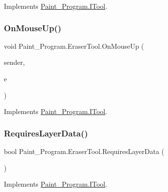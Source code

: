 Implements \mbox{\hyperlink{interface_paint___program_1_1_i_tool_a6a1cbe840b5cfc8a9b9463cc21590845}{Paint\+\_\+\+Program.\+I\+Tool}}.

\mbox{\label{class_paint___program_1_1_eraser_tool_aac92273a8f10a9f9cee6e03b1337f1c5}} 
\subsubsection{\texorpdfstring{On\+Mouse\+Up()}{OnMouseUp()}}
{\footnotesize\ttfamily void Paint\+\_\+\+Program.\+Eraser\+Tool.\+On\+Mouse\+Up (\begin{DoxyParamCaption}\item[{object}]{sender,  }\item[{Mouse\+Event\+Args}]{e }\end{DoxyParamCaption})\hspace{0.3cm}{\ttfamily [inline]}}



Implements \mbox{\hyperlink{interface_paint___program_1_1_i_tool_a47984c2879213022f1684c07f7bba73e}{Paint\+\_\+\+Program.\+I\+Tool}}.

\mbox{\label{class_paint___program_1_1_eraser_tool_a2cc4463cfa0525b3687bb227204eaa05}} 
\subsubsection{\texorpdfstring{Requires\+Layer\+Data()}{RequiresLayerData()}}
{\footnotesize\ttfamily bool Paint\+\_\+\+Program.\+Eraser\+Tool.\+Requires\+Layer\+Data (\begin{DoxyParamCaption}{ }\end{DoxyParamCaption})\hspace{0.3cm}{\ttfamily [inline]}}



Implements \mbox{\hyperlink{interface_paint___program_1_1_i_tool_a6d45b6c48da8130ae41db3a66cdaef9a}{Paint\+\_\+\+Program.\+I\+Tool}}.

